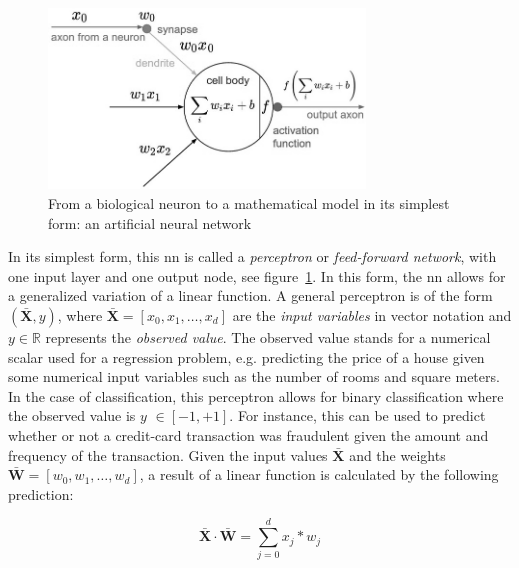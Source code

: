 \documentclass[draft,final]{vutinfth} %
\begin{document}
    \begin{figure}[h]
        \centering
        \includegraphics[width=0.75\textwidth]{figures/neuron_model.png}
        \caption[From a biological neuron to a mathematical model: an artificial neural network in its simplest form]{From a biological neuron to a mathematical model in its simplest form: an artificial neural network\protect\footnotemark}
        \label{fig:neuron_model}
    \end{figure}


    In its simplest form, this \gls{nn} is called a \textit{perceptron} or \textit{feed-forward network}, with one input layer and one output node, see figure~\ref{fig:neuron_model}.
    In this form, the \gls{nn} allows for a generalized variation of a linear function.
    A general perceptron is of the form $(\bar{\boldsymbol{X}},y)$, where $\bar{\boldsymbol{X}}=[x_0,x_1,\ldots,x_d]$ are the \textit{input variables} in vector notation and $y \in \mathbb{R}$  represents the \textit{observed value}.
    The observed value stands for a numerical scalar used for a regression problem, e.g. predicting the price of a house given some numerical input variables such as the number of rooms and square meters.
    In the case of classification, this perceptron allows for binary classification where the observed value is $y$ $\in [-1,+1]$.
    For instance, this can be used to predict whether or not a credit-card transaction was fraudulent given the amount and frequency of the transaction.
    Given the input values $\bar{\boldsymbol{X}}$ and the weights $\bar{\boldsymbol{W}}=[w_0,w_1,\ldots,w_d]$, a result of a linear function is calculated by the following prediction:

    \begin{equation}
        \bar{\boldsymbol{X}}\cdot\bar{\boldsymbol{W}}=\sum_{j=0}^{d}x_j*w_j\label{eq:feed_forward_equation}
    \end{equation}
\end{document}
